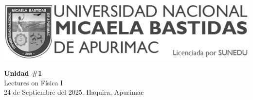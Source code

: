 

\begin{minipage}[l]{0.42\textwidth}
    \includegraphics[width=1\textwidth]{img/logo-UNAMBA.png}
\end{minipage}
\hfill
\begin{minipage}[c]{0.5\textwidth}
    \begin{flushright}
	\large{\textbf{Unidad \#1}}\\
	\large{Lectures on Física I}\\
	\large{24 de Septiembre del 2025. Haquira, Apurimac}\\
    \end{flushright}
\end{minipage}


  
